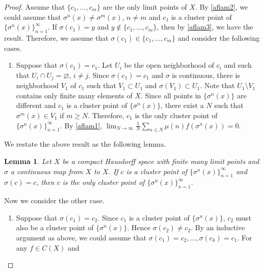 \documentclass[a4paper,10pt]{amsart}
\newtheorem{lemma}{Lemma}[section]
\begin{document}
\begin{proof}
    Assume that $\{c_1, \ldots, c_m\}$ are the only limit points
    of $X$. By \cref{aflam2}, we could assume that $\sigma^{n}(x) \neq
    \sigma^{m}(x)$, $n \neq m$ and $c_{1}$ is a cluster point of 
    $\{\sigma^{n}(x)\}_{n=1}^{\infty}$. 
    If $\sigma(c_1) = y$ and 
    $y \notin \{c_1, \ldots, c_m \}$,
    then by \cref{aflam3}, we have the result. Therefore, we assume that
    $\sigma(c_1) \in \{c_1, \ldots, c_m\}$ and consider the following cases.
     \begin{enumerate}
         \item Suppose that $\sigma(c_1) = c_1$. Let $U_i$ 
            be the open neighborhood of $c_i$ and
            such that $U_i \cap U_j = \varnothing$, $i \neq j$.
            Since $\sigma(c_1) = c_1$ and $\sigma$ is continuous,
            there is neighborhood $V_1$ of $c_1$ such that
            $V_1 \subset U_1$ and $\sigma(V_1) \subset U_1$.
            Note that $U_1 \setminus V_1$ contains only finite many 
            elements of $X$. Since all points in $\{\sigma^{n}(x)\}$
            are different and $c_1$ is a cluster point of  
            $\{\sigma^{n}(x)\}$, there exist a $N$ such that 
            $\sigma^{m}(x) \in V_1$ if $m \geq N$. Therefore, 
            $c_1$ is the only cluster point of 
            $\{\sigma^{n}(x) \}_{n =1}^{\infty}$. 
            By \cref{aflam1},  
            $\lim_{N \rightarrow \infty}
            \frac{1}{N} \sum_{n \leq N}\mu(n)f(\sigma^{n}(x)) = 0$.
    \end{enumerate}
We restate the above result as the following lemma.
    \begin{lemma}
       Let $X$ be a compact Hausdorff space with finite many limit 
       points and $\sigma$ a continuous map from $X$ to $X$. If 
       $c$ is a cluster point of $\{\sigma^{n}(x)\}_{n=1}^{\infty}$
       and $\sigma(c) = c$, then
       $c$ is the only cluster point of $\{\sigma^{n}(x)\}_{n=1}^{\infty}$.
    \end{lemma}
    Now we consider the other case.
    \begin{enumerate}[resume]
        \item Suppose that $\sigma(c_1) = c_2$. Since $c_1$ is 
            a cluster point of $\{ \sigma^{n}(x) \}$, 
            $c_2$ must also be a cluster point of 
            $\{ \sigma^{n}(x) \}$. Hence $\sigma(c_2) \neq c_2$. 
            By an inductive argument as above, we could assume that 
            $\sigma(c_1) = c_2, \ldots, \sigma(c_{k}) 
            = c_{1}$. For any $f \in C(X)$ and 

\end{enumerate}
\end{proof}
\end{document}

